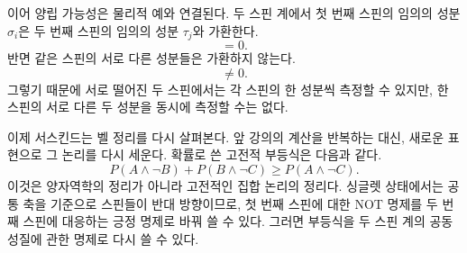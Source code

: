 이어 양립 가능성은 물리적 예와 연결된다. 두 스핀 계에서 첫 번째 스핀의 임의의 성분 \(\sigma_i\)은 두 번째 스핀의 임의의 성분 \(\tau_j\)와 가환한다. \begin{equation}
[\sigma_i,\tau_j]=0.
\end{equation} 반면 같은 스핀의 서로 다른 성분들은 가환하지 않는다. \begin{equation}
[\sigma_1,\sigma_3]\neq 0.
\end{equation} 그렇기 때문에 서로 떨어진 두 스핀에서는 각 스핀의 한 성분씩 측정할 수 있지만, 한 스핀의 서로 다른 두 성분을 동시에 측정할 수는 없다.

\begin{classroomqa}\end{classroomqa}

\begin{classroomqa}\end{classroomqa}

\begin{classroomqa}\end{classroomqa}

이제 서스킨드는 벨 정리를 다시 살펴본다. 앞 강의의 계산을 반복하는 대신, 새로운 표현으로 그 논리를 다시 세운다. 확률로 쓴 고전적 부등식은 다음과 같다. \begin{equation}
P(A\wedge \neg B)+P(B\wedge \neg C)\ge P(A\wedge \neg C).
\end{equation} 이것은 양자역학의 정리가 아니라 고전적인 집합 논리의 정리다. 싱글렛 상태에서는 공통 축을 기준으로 스핀들이 반대 방향이므로, 첫 번째 스핀에 대한 NOT 명제를 두 번째 스핀에 대응하는 긍정 명제로 바꿔 쓸 수 있다. 그러면 부등식을 두 스핀 계의 공동 성질에 관한 명제로 다시 쓸 수 있다.

